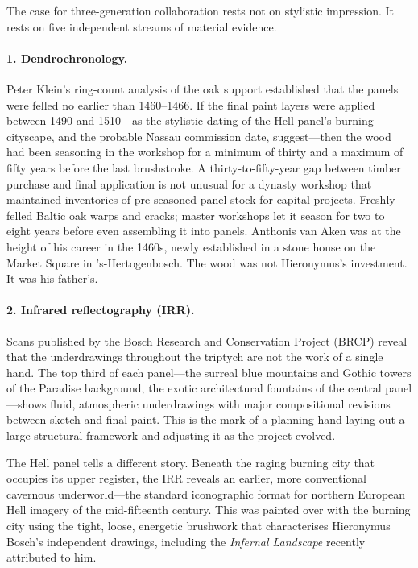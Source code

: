 The case for three-generation collaboration rests not on stylistic
impression.  It rests on five independent streams of material evidence.

\paragraph{1. Dendrochronology.}
Peter Klein's ring-count analysis of the oak support established that the
panels were felled no earlier than 1460--1466.  If the final paint layers
were applied between 1490 and 1510---as the stylistic dating of the Hell
panel's burning cityscape, and the probable Nassau commission date,
suggest---then the wood had been seasoning in the workshop for a minimum of
thirty and a maximum of fifty years before the last brushstroke.  A
thirty-to-fifty-year gap between timber purchase and final application is
not unusual for a dynasty workshop that maintained inventories of
pre-seasoned panel stock for capital projects.  Freshly felled Baltic oak
warps and cracks; master workshops let it season for two to eight years
before even assembling it into panels.  Anthonis van Aken was at the height
of his career in the 1460s, newly established in a stone house on the
Market Square in 's-Hertogenbosch.  The wood was not Hieronymus's
investment.  It was his father's.

\paragraph{2. Infrared reflectography (IRR).}
Scans published by the Bosch Research and Conservation Project (BRCP)
reveal that the underdrawings throughout the triptych are not the work of
a single hand.  The top third of each panel---the surreal blue mountains
and Gothic towers of the Paradise background, the exotic architectural
fountains of the central panel---shows fluid, atmospheric underdrawings
with major compositional revisions between sketch and final paint.  This
is the mark of a planning hand laying out a large structural framework and
adjusting it as the project evolved.

The Hell panel tells a different story.  Beneath the raging burning city
that occupies its upper register, the IRR reveals an earlier, more
conventional cavernous underworld---the standard iconographic format for
northern European Hell imagery of the mid-fifteenth century.  This was
painted over with the burning city using the tight, loose, energetic
brushwork that characterises Hieronymus Bosch's independent drawings,
including the \textit{Infernal Landscape} recently attributed to him.

